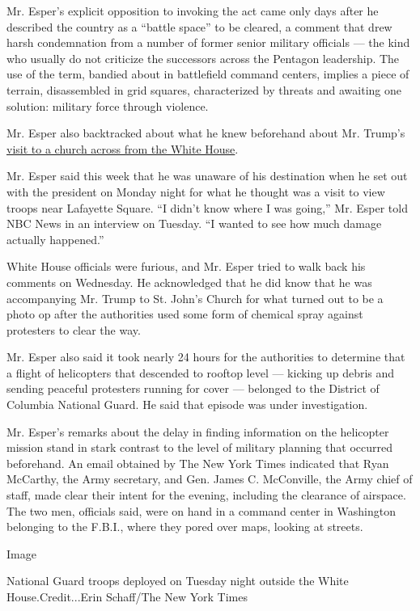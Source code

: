 Mr. Esper's explicit opposition to invoking the act came only days after
he described the country as a ``battle space'' to be cleared, a comment
that drew harsh condemnation from a number of former senior military
officials --- the kind who usually do not criticize the successors
across the Pentagon leadership. The use of the term, bandied about in
battlefield command centers, implies a piece of terrain, disassembled in
grid squares, characterized by threats and awaiting one solution:
military force through violence.

Mr. Esper also backtracked about what he knew beforehand about Mr.
Trump's
\href{https://www.nytimes.com/2020/06/02/us/politics/trump-walk-lafayette-square.html}{visit
to a church across from the White House}.

Mr. Esper said this week that he was unaware of his destination when he
set out with the president on Monday night for what he thought was a
visit to view troops near Lafayette Square. ``I didn't know where I was
going,'' Mr. Esper told NBC News in an interview on Tuesday. ``I wanted
to see how much damage actually happened.''

White House officials were furious, and Mr. Esper tried to walk back his
comments on Wednesday. He acknowledged that he did know that he was
accompanying Mr. Trump to St. John's Church for what turned out to be a
photo op after the authorities used some form of chemical spray against
protesters to clear the way.

Mr. Esper also said it took nearly 24 hours for the authorities to
determine that a flight of helicopters that descended to rooftop level
--- kicking up debris and sending peaceful protesters running for cover
--- belonged to the District of Columbia National Guard. He said that
episode was under investigation.

Mr. Esper's remarks about the delay in finding information on the
helicopter mission stand in stark contrast to the level of military
planning that occurred beforehand. An email obtained by The New York
Times indicated that Ryan McCarthy, the Army secretary, and Gen. James
C. McConville, the Army chief of staff, made clear their intent for the
evening, including the clearance of airspace. The two men, officials
said, were on hand in a command center in Washington belonging to the
F.B.I., where they pored over maps, looking at streets.

Image

National Guard troops deployed on Tuesday night outside the White
House.Credit...Erin Schaff/The New York Times


